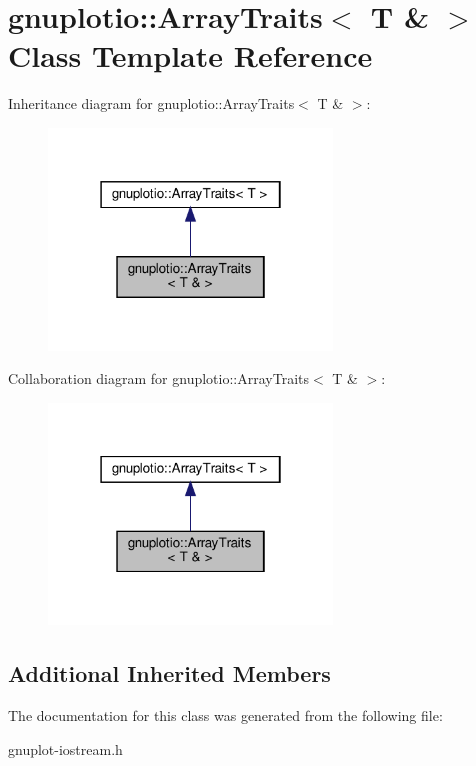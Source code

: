 \hypertarget{classgnuplotio_1_1ArrayTraits_3_01T_01_6_01_4}{}\section{gnuplotio\+:\+:Array\+Traits$<$ T \& $>$ Class Template Reference}
\label{classgnuplotio_1_1ArrayTraits_3_01T_01_6_01_4}


Inheritance diagram for gnuplotio\+:\+:Array\+Traits$<$ T \& $>$\+:
\nopagebreak
\begin{figure}[H]
\begin{center}
\leavevmode
\includegraphics[width=214pt]{classgnuplotio_1_1ArrayTraits_3_01T_01_6_01_4__inherit__graph}
\end{center}
\end{figure}


Collaboration diagram for gnuplotio\+:\+:Array\+Traits$<$ T \& $>$\+:
\nopagebreak
\begin{figure}[H]
\begin{center}
\leavevmode
\includegraphics[width=214pt]{classgnuplotio_1_1ArrayTraits_3_01T_01_6_01_4__coll__graph}
\end{center}
\end{figure}
\subsection*{Additional Inherited Members}


The documentation for this class was generated from the following file\+:\begin{DoxyCompactItemize}
\item 
gnuplot-\/iostream.\+h\end{DoxyCompactItemize}
